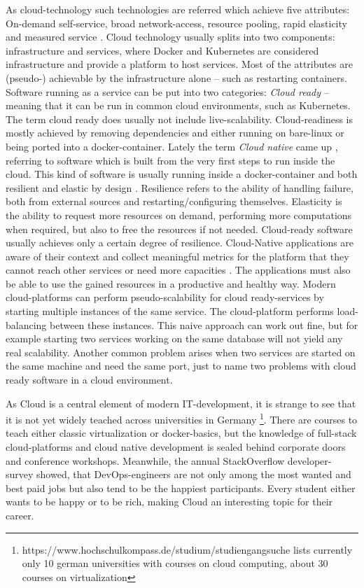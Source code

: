 \documentclass[utf8]{lni}
\begin{document}
As cloud-technology such technologies are referred which achieve five attributes: 
On-demand self-service, broad network-access, resource pooling, rapid elasticity and measured service \cite{ME11}. 
Cloud technology usually splits into two components:  infrastructure  and  services,  where  Docker and Kubernetes are considered infrastructure and provide a  platform  to  host  services.  
Most  of  the  attributes  are (pseudo-) achievable by the infrastructure alone – such as restarting containers. 
Software running as a service can be put into two categories: 
\textit{Cloud ready} – meaning that it can be run in common cloud environments, such as Kubernetes. 
The term cloud ready  does  usually  not  include  live-scalability. Cloud-readiness is mostly achieved by removing dependencies and either running on bare-linux or being ported into a docker-container. 
Lately the term \textit{Cloud native} came up \cite{BI17}, referring to software which is built from the very first steps to run inside the cloud. This kind of software is usually running inside a docker-container and both resilient and elastic by design \cite{TO17}.  
Resilience refers to the ability of handling failure, both from external sources and restarting/configuring themselves.  
Elasticity is the ability to request more resources on demand, performing more computations when required, but also to free the resources if not needed. 
Cloud-ready software usually achieves only a certain degree of resilience.   
Cloud-Native applications are aware of their context and collect meaningful metrics for the platform that they cannot reach other services or need more capacities \cite{MIN18}. 
The applications must also be able to use the gained resources in a productive and healthy way.  
Modern  cloud-platforms  can  perform  pseudo-scalability for cloud ready-services by starting multiple instances of the same service. 
The cloud-platform performs load-balancing between these instances. 
This naive approach can work out fine, but for example starting two services working on the same database will not yield any real scalability. 
Another common problem arises when two services are started on the same machine and need the same port, just to name two problems with cloud ready  software in a cloud environment. 

As Cloud is a central element of modern IT-development, it is strange to see that it is not yet widely teached across 
universities in Germany \footnote{https://www.hochschulkompass.de/studium/studiengangsuche lists currently only 10 german universities with courses on cloud computing, about 30 courses on virtualization }.
There are courses to teach either classic virtualization or docker-basics, but the knowledge of full-stack cloud-platforms and cloud native development is sealed behind corporate doors and conference workshops.
Meanwhile,  the  annual  StackOverflow  developer-survey \cite{SO19} showed, that DevOps-engineers are not only 
among the most wanted and best paid jobs but also tend to be the happiest participants.  
Every student either wants to be happy or to be rich, making Cloud an interesting topic for their career. 
\end{document}
